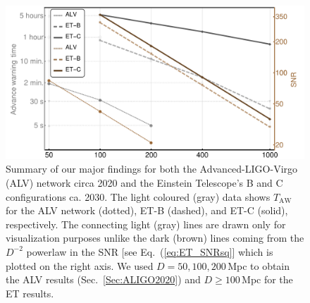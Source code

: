 \documentclass[amsmath,amssymb,aps,floats,amsfonts,notitlepage,superscriptaddress,eqsecnum,nofootinbib,10pt]{revtex4-1}
\begin{document}
\begin{figure}[h!]
\includegraphics[width=\linewidth]{../Figures/Main_results.pdf}
\caption{Summary of our major findings for both the Advanced-LIGO-Virgo (ALV) network circa 2020 and the Einstein Telescope's B and C configurations
ca. 2030. The light coloured (gray) data shows $T_\text{AW}$ for the ALV network (dotted), ET-B (dashed), and ET-C (solid), respectively.
The connecting light (gray) lines are drawn only for visualization purposes unlike the dark (brown) lines coming from the $D^{-2}$ powerlaw in the SNR [see Eq.~(\ref{eq:ET_SNRsq}] which is plotted on the right axis. 
We used $D=50,100,200\,$Mpc to obtain the ALV results (Sec.~\ref{Sec:ALIGO2020}) and $D\ge 100\,$Mpc for the ET results.}\label{fig:summary}
\label{fig:summary}
\end{figure}



\end{document}
